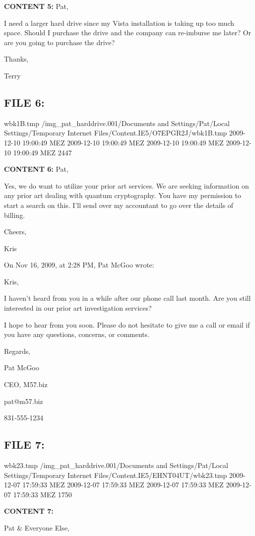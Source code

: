 \textbf{CONTENT 5:}
Pat,

I need a larger hard drive since my Vista installation is taking up too 
much space.  Should I purchase the drive and the company can re-imburse me 
later?  Or are you going to purchase the drive?

Thanks,

Terry

\subsection{FILE 6:}
wbk1B.tmp	/img_pat_harddrive.001/Documents and Settings/Pat/Local Settings/Temporary Internet Files/Content.IE5/O7EPGR2J/wbk1B.tmp		2009-12-10 19:00:49 MEZ	2009-12-10 19:00:49 MEZ	2009-12-10 19:00:49 MEZ	2009-12-10 19:00:49 MEZ	2447	

\textbf{CONTENT 6:}
Pat,

Yes, we do want to utilize your prior art services. We are seeking 
information on any prior art dealing with quantum cryptography. You have my 
permission to start a search on this. I'll send over my accountant to go 
over the details of billing.

Cheers,

Kris


On Nov 16, 2009, at 2:28 PM, Pat McGoo wrote:


Kris,

I haven't heard from you in a while after our phone call last month. 
Are you still interested in our prior art investigation services?

I hope to hear from you soon.  Please do not hesitate to give me a call
or email if you have any questions, concerns, or comments.

Regards,

Pat McGoo

CEO, M57.biz

pat@m57.biz

831-555-1234

\subsection{FILE 7:}
wbk23.tmp	/img_pat_harddrive.001/Documents and Settings/Pat/Local Settings/Temporary Internet Files/Content.IE5/EHNT04UT/wbk23.tmp		2009-12-07 17:59:33 MEZ	2009-12-07 17:59:33 MEZ	2009-12-07 17:59:33 MEZ	2009-12-07 17:59:33 MEZ	1750	

\textbf{CONTENT 7:}

Pat & Everyone Else,

